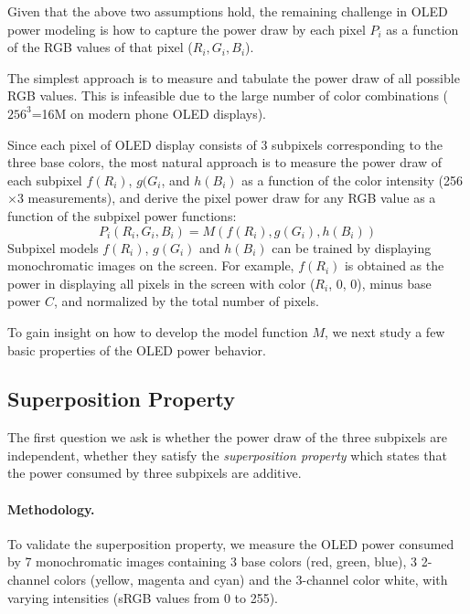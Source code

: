 Given that the above two assumptions hold, the remaining challenge
in OLED power modeling
is how to capture the power draw by each pixel $P_i$ as a function of the RGB
values of that pixel ($R_i, G_i,B_i$).

The simplest approach is to measure and tabulate
the power draw of all possible RGB values. This is infeasible
due to the large number of color combinations ($256^3$=16M on modern phone OLED displays).

Since each pixel of OLED display consists of 3 subpixels corresponding
to the three base colors, the most natural approach is to measure the
power draw of each subpixel $f(R_{i})$, $g(G_{i}$, and $h(B_{i})$ as a
function of the color intensity (256$\times$3 measurements), and derive the pixel power
draw for any RGB value as a function of the subpixel power functions:
\begin{equation}
	P_i(R_i, G_i,B_i) = M(f(R_{i}), g(G_{i}), h(B_{i}))
	\label{eq:linear_equation1}
\end{equation}
Subpixel models $f(R_{i})$, $g(G_{i})$ and $h(B_{i})$ can be
trained by displaying monochromatic images on the screen.  For
example, $f(R_{i})$ is obtained as the power in displaying all pixels
in the screen with color ($R_{i}$, 0, 0), minus base power $C$,
and normalized by the total number of pixels.

To gain insight on how to develop the model function $M$,
we next study a few basic properties of the OLED power behavior.

\fi

\subsection{Superposition Property}
\label{subsec:super}

The first question we ask is whether the power draw of the three
subpixels are independent, \ie whether they satisfy the {\em superposition
property} which states that the power consumed by three subpixels are
additive.

\paragraph{Methodology.}
To validate the superposition property, 
we measure the OLED power consumed by
7 monochromatic images containing 3 base colors (red, green, blue),
3 2-channel colors (yellow, magenta and cyan)
and the 3-channel color white, with varying intensities (sRGB values from 0 to 255).


